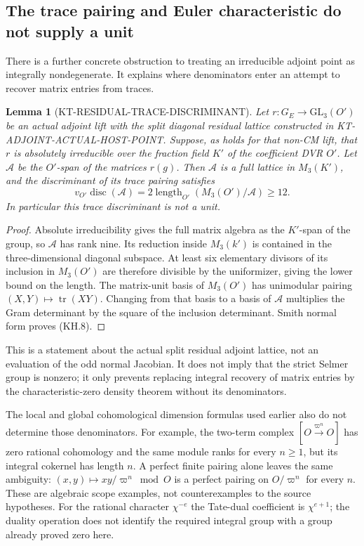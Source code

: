 \documentclass[11pt,a4paper]{article}
\newtheorem{lemma}[theorem]{Lemma}
\theoremstyle{definition}
\begin{document}
\subsection{The trace pairing and Euler characteristic do not supply a unit}

There is a further concrete obstruction to treating an
irreducible adjoint point as integrally nondegenerate.  It
explains where denominators enter an attempt to recover matrix
entries from traces.

\begin{lemma}[KT-RESIDUAL-TRACE-DISCRIMINANT]
Let $r:G_E\to\mathrm{GL}_3(O')$ be an actual adjoint lift with
the split diagonal residual lattice constructed in
KT-ADJOINT-ACTUAL-HOST-POINT.  Suppose, as holds for that
non-CM lift, that $r$ is absolutely irreducible over the fraction
field $K'$ of the coefficient DVR $O'$.  Let $\mathcal A$ be
the $O'$-span of the matrices $r(g)$.  Then $\mathcal A$ is a
full lattice in $M_3(K')$, and the discriminant of its trace
pairing satisfies
\[
 v_{O'}\operatorname{disc}(\mathcal A)
       =2\operatorname{length}_{O'}(M_3(O')/\mathcal A)
       \geq12.                                             \tag{KH.8}
\]
In particular this trace discriminant is not a unit.
\end{lemma}
\begin{proof}
Absolute irreducibility gives the full matrix algebra as the
$K'$-span of the group, so $\mathcal A$ has rank nine.  Its
reduction inside $M_3(k')$ is contained in the three-dimensional
diagonal subspace.  At least six elementary divisors of its
inclusion in $M_3(O')$ are therefore divisible by the uniformizer,
giving the lower bound on the length.  The matrix-unit basis of
$M_3(O')$ has unimodular pairing $(X,Y)\mapsto\operatorname{tr}(XY)$.
Changing from that basis to a basis of $\mathcal A$ multiplies
the Gram determinant by the square of the inclusion determinant.
Smith normal form proves (KH.8).
\end{proof}

This is a statement about the actual split residual adjoint
lattice, not an evaluation of the odd normal Jacobian.  It
does not imply that the strict Selmer group is nonzero; it
only prevents replacing integral recovery of matrix entries by
the characteristic-zero density theorem without its denominators.

The local and global cohomological dimension formulas used
earlier also do not determine those denominators.  For example,
the two-term complex
$[O\xrightarrow{\varpi^n}O]$ has zero rational cohomology and
the same module ranks for every $n\geq1$, but its integral
cokernel has length $n$.  A perfect finite pairing alone leaves
the same ambiguity: $(x,y)\mapsto xy/\varpi^n\bmod O$ is a
perfect pairing on $O/\varpi^n$ for every $n$.  These are algebraic
scope examples, not counterexamples to the source hypotheses.
For the rational character $\chi^{-e}$ the Tate-dual coefficient
is $\chi^{e+1}$; the duality operation does not identify the
required integral group with a group already proved zero here.
\end{document}
